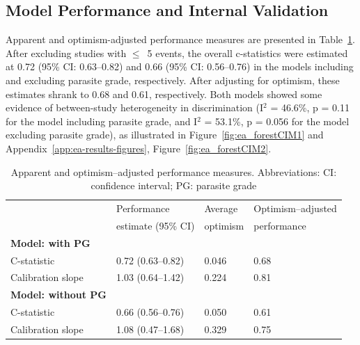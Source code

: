 \subsection{Model Performance and Internal Validation}

Apparent and optimism-adjusted performance measures are presented in Table~\ref{tab:ea-performance}. After excluding studies with $\leq$~5 events, the overall c-statistics were estimated at 0.72 (95\% CI: 0.63--0.82) and 0.66 (95\% CI: 0.56--0.76) in the models including and excluding parasite grade, respectively. After adjusting for optimism, these estimates shrank to 0.68 and 0.61, respectively. Both models showed some evidence of between-study heterogeneity in discrimination (I$^2$ = 46.6\%, p = 0.11 for the model including parasite grade, and I$^2$ = 53.1\%, p = 0.056 for the model excluding parasite grade), as illustrated in Figure~\ref{fig:ea_forestCIM1} and Appendix~\ref{app:ea-results-figures}, Figure~\ref{fig:ea_forestCIM2}.

\begin{table}[htbp]
  \begin{tabular}{@{}llll@{}}
    \toprule
                                   & Performance        & Average  & Optimism--adjusted \\
                                   & estimate (95\% CI) & optimism & performance        \\        \midrule
    \textbf{Model: with PG}        &                    &          &                    \\
    \hspace{1em} C-statistic       & 0.72 (0.63--0.82)  & 0.046    & 0.68               \\
    \hspace{1em} Calibration slope & 1.03 (0.64--1.42)  & 0.224    & 0.81               \\        \midrule
    \textbf{Model: without PG}     &                    &          &                    \\
    \hspace{1em} C-statistic       & 0.66 (0.56--0.76)  & 0.050    & 0.61               \\
    \hspace{1em} Calibration slope & 1.08 (0.47--1.68)  & 0.329    & 0.75               \\        \bottomrule
  \end{tabular}
  \caption{Apparent and optimism--adjusted performance measures. Abbreviations: CI: confidence interval; PG: parasite grade}
  \label{tab:ea-performance}
\end{table}

